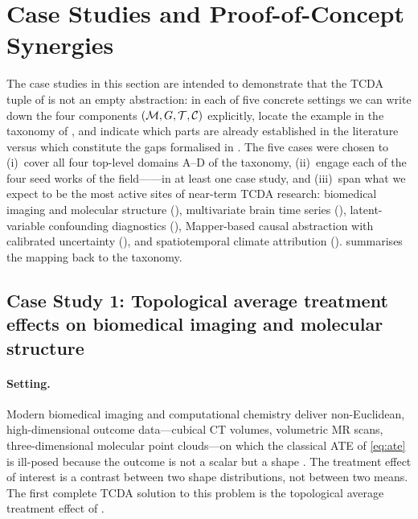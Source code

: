 \section{Case Studies and Proof-of-Concept Synergies}\label{sec:case_studies}

The case studies in this section are intended to demonstrate that the
TCDA tuple of  is not an empty abstraction: in each of
five concrete settings we can write down the four components
$(\mathcal{M}, G, \mathcal{T}, \mathcal{C})$ explicitly, locate the example in the taxonomy of
, and indicate which parts are already established in
the literature versus which constitute the gaps formalised in
. The five cases were chosen to (i)~cover all four
top-level domains A--D of the taxonomy, (ii)~engage each of the four
seed works of the field---\citet{ibeling2021topological,
kim2026topological,lecci2014statistical,elyaagoubi2023statistical}---in
at least one case study, and (iii)~span what we expect to be the most
active sites of near-term TCDA research: biomedical imaging and
molecular structure (), multivariate brain time series
(), latent-variable confounding diagnostics
(), Mapper-based causal abstraction with
calibrated uncertainty (), and spatiotemporal
climate attribution (). 
summarises the mapping back to the taxonomy.

\subsection{Case Study 1: Topological average treatment effects on
biomedical imaging and molecular structure}\label{sec:cs_tate}

\paragraph{Setting.}
Modern biomedical imaging and computational chemistry deliver
non-Euclidean, high-dimensional outcome data---cubical CT volumes,
volumetric MR scans, three-dimensional molecular point clouds---on
which the classical ATE of \cref{eq:ate} is ill-posed because the
outcome is not a scalar but a shape \citep{soares2020sars,
axelrod2022geom,iqbal2025classification,carlsson2020topological}. The
treatment effect of interest is a contrast between two shape
distributions, not between two means. The first complete TCDA solution
to this problem is the topological average treatment effect of
\citet{kim2026topological}.

